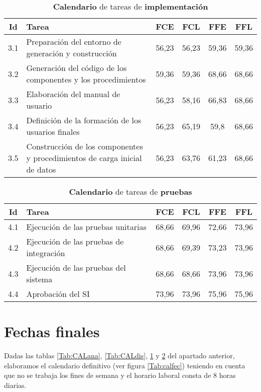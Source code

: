 \documentclass[11pt,a4paper,spanish,twoside]{report}
\begin{document}
\begin{table}[!h]
  \centering
  \begin{tabular}{|c||p{5.3cm}||c|c|c|c|}
    \hline
    \textbf{Id} & \textbf{Tarea} & \textbf{FCE} & \textbf{FCL} &
    \textbf{FFE} & \textbf{FFL}\\
    \hline \hline
    3.1 & Preparación del entorno de generación y construcción & 56,23 &
    56,23 & 59,36 & 59,36\\ 
    \hline
    3.2 & Generación del código de los componentes y los procedimientos
    &59,36 & 59,36 & 68,66 & 68,66\\ 
    \hline
    3.3 & Elaboración del manual de usuario & 56,23 & 58,16 & 66,83 & 68,66\\
    \hline
    3.4 & Definición de la formación de los usuarios finales & 56,23 &
    65,19 & 59,8 & 68,66\\ 
    \hline
    3.5 & Construcción de los componentes y procedimientos de carga inicial
    de datos & 56,23 & 63,76 & 61,23 & 68,66\\
    \hline
  \end{tabular}
  \caption{\textbf{Calendario} de tareas de \textbf{implementación}}
  \label{Tab:CALimp}
\end{table}
    
\begin{table}[!h]
  \centering
  \begin{tabular}{|c||p{5.3cm}||c|c|c|c|}
    \hline
    \textbf{Id} & \textbf{Tarea} & \textbf{FCE} & \textbf{FCL} &
    \textbf{FFE} & \textbf{FFL}\\
    \hline \hline
    4.1 & Ejecución de las pruebas unitarias & 68,66 & 69,96 & 72,66 & 73,96\\
    \hline
    4.2 & Ejecución de las pruebas de integración & 68,66 & 69,39 & 73,23 &
    73,96\\ 
    \hline
    4.3 & Ejecución de las pruebas del sistema & 68,66 & 68,66 & 73,96 &
    73,96 \\ 
    \hline
    4.4 & Aprobación del SI & 73,96 & 73,96 & 75,96 & 75,96\\
    \hline
  \end{tabular}
  \caption{\textbf{Calendario} de tareas de \textbf{pruebas}}
  \label{Tab:CALpru}
\end{table}


\section{Fechas finales}
Dadas las tablas \ref{Tab:CALana}, \ref{Tab:CALdis}, \ref{Tab:CALimp} y
\ref{Tab:CALpru} del apartado anterior, elaboramos el calendario definitivo
(ver figura \ref{Tab:calfec}) teniendo en cuenta que no se trabaja los fines
de semana y el horario laboral consta de 8 horas diarias.
 
\end{document}
